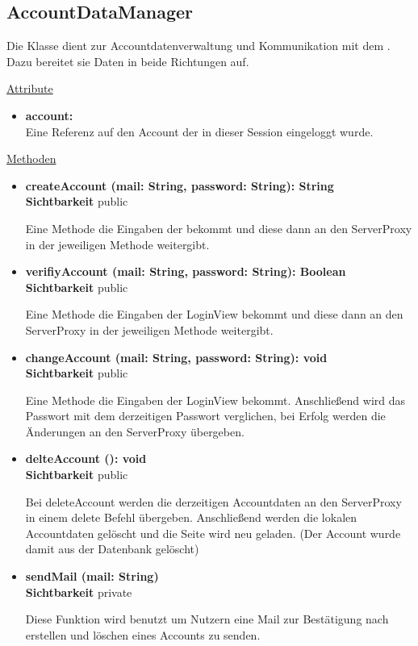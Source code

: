 \newpage
\subsection{AccountDataManager}\label{AccountDataManager}
Die Klasse dient zur Accountdatenverwaltung und Kommunikation mit dem . Dazu bereitet sie Daten in beide Richtungen auf.

\underline{Attribute}
\begin{itemize}
\itemsep0pt

\item \textbf{account: } \hfill\\ 
Eine Referenz auf den Account der in dieser Session eingeloggt wurde.

\end{itemize}

\underline{Methoden}
\begin{itemize}
\itemsep0pt
\item \textbf{createAccount (mail: String, password: String): String}\hfill\\
\textbf{Sichtbarkeit} public

Eine Methode die Eingaben der  bekommt und diese dann an den ServerProxy in der jeweiligen Methode weitergibt.

\item \textbf{verifiyAccount (mail: String, password: String): Boolean}\hfill\\
\textbf{Sichtbarkeit} public

Eine Methode die Eingaben der LoginView bekommt und diese dann an den ServerProxy in der jeweiligen Methode weitergibt.

\item \textbf{changeAccount (mail: String, password: String): void}\hfill\\
\textbf{Sichtbarkeit} public

Eine Methode die Eingaben der LoginView bekommt. Anschließend wird das Passwort mit dem derzeitigen Passwort verglichen, bei Erfolg werden die Änderungen an den ServerProxy übergeben.

\item \textbf{delteAccount (): void}\hfill\\
\textbf{Sichtbarkeit} public

Bei deleteAccount werden die derzeitigen Accountdaten an den ServerProxy in einem delete Befehl übergeben. Anschließend werden die lokalen Accountdaten gelöscht und die Seite wird neu geladen. 
(Der Account wurde damit aus der Datenbank gelöscht)

\item \textbf{sendMail (mail: String)}\hfill\\
\textbf{Sichtbarkeit} private

Diese Funktion wird benutzt um Nutzern eine Mail zur Bestätigung nach erstellen und löschen eines Accounts zu senden.
\end{itemize}
